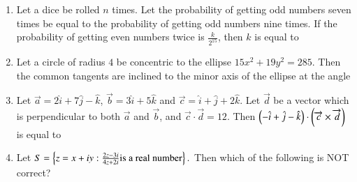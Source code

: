 \documentclass[journal]{IEEEtran}
\begin{document}
\begin{enumerate}[start = 16]
		


	\item Let a dice be rolled $n$ times. Let the probability of getting odd numbers seven times be equal to the probability of getting odd numbers nine times. If the probability of getting even numbers twice is $\frac{k}{2^{15}}$, then $k$ is equal to
	\begin{enumerate}
	\begin{multicols}{4}
		\item $60$ 
		\item $30$
		\item $90$
		\item $15$
		\end{multicols}
	\end{enumerate}

\item Let a circle of radius $4$ be concentric to the ellipse $15x^2 + 19y^2 = 285.$ Then the common tangents are inclined
to the minor axis of the ellipse at the angle

	
	\begin{enumerate}
	\begin{multicols}{4}
		\item $\frac{\pi}{6}$
		\item $\frac{\pi}{12}$
		\item $\frac{\pi}{3}$
		\item $\frac{\pi}{4}$
	\end{multicols}
	\end{enumerate}
\item Let $\overrightarrow{a} = 2\hat{i} + 7\hat{j} - \hat{k}$, $\overrightarrow{b} = 3\hat{i} + 5\hat{k}$ and $\overrightarrow{c} = \hat{i} + \hat{j} + 2\hat{k}$. Let $\overrightarrow{d}$ be a vector which is perpendicular to both $\overrightarrow{a}$ and $\overrightarrow{b}$, and $\overrightarrow{c}\cdot\overrightarrow{d} = 12$. Then $\left(-\hat{i} + \hat{j} - \hat{k}\right)\cdot\left(\overrightarrow{c}\times\overrightarrow{d}\right)$is equal to	
	\begin{enumerate}
	\end{enumerate}
\item Let $S = \left\{z = x + iy : \frac{2z-3i}{4z+2i} \text{is a real number}\right\}.$ Then which of the following is NOT correct?
        

\end{enumerate}
\end{document}
